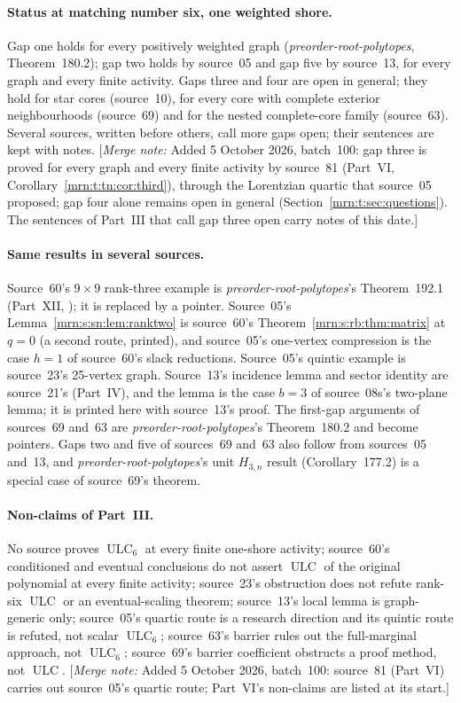 \documentclass[11pt,a4paper]{article}
\theoremstyle{remark}\newtheorem{remark}[theorem]{Remark}
\newcommand{\ULC}{\operatorname{ULC}}      %
\newcommand{\mnote}[1]{[\textit{Merge note:} #1]}
\newcommand{\prp}{\emph{preorder-root-polytopes}}
\begin{document}
\paragraph{Status at matching number six, one weighted shore.}
Gap one holds for every positively weighted graph (\prp, Theorem~180.2);
gap two holds by source~05 and gap five by source~13, for every graph and
every finite activity. Gaps three and four are open in general; they hold
for star cores (source~10), for every core with complete exterior
neighbourhoods (source~69) and for the nested complete-core family
(source~63). Several sources, written before others, call more gaps open;
their sentences are kept with notes.
\mnote{Added 5 October 2026, batch~100: gap three is proved for every graph and every finite
activity by source~81 (Part~VI, Corollary~\ref{mrn:t:tn:cor:third}), through
the Lorentzian quartic that source~05 proposed; gap four alone remains open
in general (Section~\ref{mrn:t:sec:questions}). The sentences of Part~III
that call gap three open carry notes of this date.}

\paragraph{Same results in several sources.}
Source~60's $9\times9$ rank-three example is \prp's Theorem~192.1 (Part~XII,
); it is replaced by a pointer. Source~05's
Lemma~\ref{mrn:s:sn:lem:ranktwo} is source~60's Theorem~\ref{mrn:s:rb:thm:matrix}
at $q=0$ (a second route, printed), and source~05's one-vertex compression is
the case $h=1$ of source~60's slack reductions. Source~05's quintic example is
source~23's 25-vertex graph. Source~13's incidence lemma and sector identity
are source~21's (Part~IV), and the lemma is the case $b=3$ of
source~08s's two-plane lemma; it is printed here with source~13's proof. The
first-gap arguments of sources~69 and~63 are \prp's Theorem~180.2 and become
pointers. Gaps two and five of sources~69 and~63 also follow from sources~05
and~13, and \prp's unit $H_{3,n}$ result (Corollary~177.2) is a special case of
source~69's theorem.

\paragraph{Non-claims of Part~III.}
No source proves $\ULC_6$ at every finite one-shore activity; source~60's
conditioned and eventual conclusions do not assert $\ULC$ of the original
polynomial at every finite activity; source~23's obstruction does not refute
rank-six $\ULC$ or an eventual-scaling theorem; source~13's local lemma is
graph-generic only; source~05's quartic route is a research direction and
its quintic route is refuted, not scalar $\ULC_6$; source~63's barrier rules
out the full-marginal approach, not $\ULC_6$; source~69's barrier
coefficient obstructs a proof method, not $\ULC$.
\mnote{Added 5 October 2026, batch~100: source~81 (Part~VI) carries out source~05's quartic
route; Part~VI's non-claims are listed at its start.}
\end{document}
